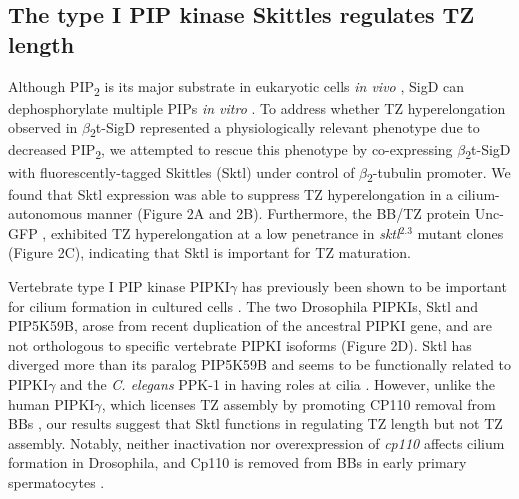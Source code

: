 \documentclass[12pt, twoside, letterpaper]{article}
\newcommand{\PIP}{PIP\textsubscript{2}}
\newcommand{\sigd}{$\beta$\textsubscript{2}t-SigD}
\begin{document}
\begin{doublespacing}
\begin{linenumbers}
    \subsection*{The type I PIP kinase Skittles regulates TZ length}
    Although \PIP{} is its major substrate in eukaryotic cells \textit{in vivo}
    \citep{terebiznik2002elimination, zhou2001salmonella, sengupta2013depletion},
    SigD can dephosphorylate multiple PIPs \textit{in vitro}
    \citep{norris1998sopb}.
    To address whether TZ hyperelongation observed in \sigd{} represented a
    physiologically relevant phenotype due to decreased \PIP{},
    we attempted to rescue this phenotype by
    co-expressing \sigd{} with
    fluorescently-tagged Skittles (Sktl)
    under control of $\beta$\textsubscript{2}-tubulin promoter.
    We found that Sktl expression was able to suppress TZ hyperelongation
    in a cilium-autonomous manner (Figure 2A and 2B).
    Furthermore, the BB/TZ protein Unc-GFP
    \citep{baker2004mechanosensory, wei2008depletion},
    exhibited TZ hyperelongation at a low penetrance in \textit{sktl}$^{2.3}$
    mutant clones (Figure 2C),
    indicating that Sktl is important for TZ maturation.

    Vertebrate type I PIP kinase PIPKI$\gamma$ has previously been shown to be important for cilium formation in cultured cells
    \citep{xu2016phosphatidylinositol}.
    The two Drosophila PIPKIs, Sktl and PIP5K59B,
    arose from recent duplication of
    the ancestral PIPKI gene,
    and are not orthologous to specific vertebrate PIPKI isoforms (Figure 2D).
    Sktl has diverged more than its paralog PIP5K59B and seems
    to be functionally related to PIPKI$\gamma$
    and the \textit{C. elegans} PPK-1 in having roles at cilia \citep{xu2014pipkigamma}.
    However, unlike the human PIPKI$\gamma$, which licenses TZ assembly
    by promoting CP110 removal from BBs \citep{xu2016phosphatidylinositol},
    our results suggest that Sktl functions in
    regulating TZ length but not TZ assembly. 
    Notably, neither inactivation nor overexpression of \textit{cp110} affects
    cilium formation in Drosophila, and Cp110
    is removed from BBs in early primary spermatocytes
    \citep{franz2013cp110}.
    

\end{linenumbers}
\end{doublespacing}
\end{document}
